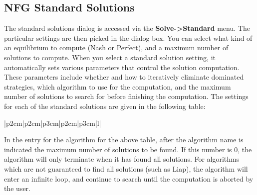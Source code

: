 \subsection{NFG Standard Solutions}\label{NFGStandardSolutions}

The standard solutions dialog is accessed via the {\bf Solve->Standard} 
menu.  The particular settings are then picked in the dialog box.  You
can select what kind of an equilibrium to compute (Nash or Perfect),
and a maximum number of solutions to compute.  When you select a
standard solution setting, it automatically sets various parameters
that control the solution computation.  These parameters include
whether and how to iteratively eliminate dominated strategies, which
algorithm to use for the computation, and the maximum number of
solutions to search for before finishing the computation.  The
settings for each of the standard solutions are given in the following
table:

\begin{tabular}{|p{2cm}|p{2cm}|p{3cm}|p{2cm}|p{3cm}|l|}
\hline
{}
\hline
{}
\hline
{}
\hline
\hline
{}
\hline
{}
\hline
{}
\hline
\end{tabular}

In the entry for the algorithm for the above table, after the algorithm name is 
indicated the maximum number of solutions 
to be found.  If this number is 0, the algorithm will only terminate when it has found 
all solutions.  For algorithms which are not guaranteed to find all solutions (such 
as Liap), the 
algorithm will enter an infinite loop, and continue to search until the computation is 
aborted by the user. 
 

